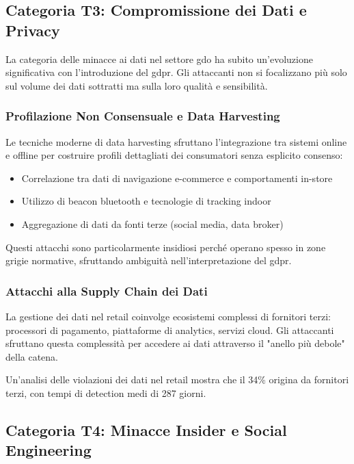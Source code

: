 \subsection{\texorpdfstring{Categoria T3: Compromissione dei Dati e Privacy}{2.2.4 - Categoria T3: Compromissione dei Dati e Privacy}}
\label{subsec:2.2.4_t3}

La categoria delle minacce ai dati nel settore \gls{gdo} ha subito un'evoluzione significativa con l'introduzione del \gls{gdpr}. Gli attaccanti non si focalizzano più solo sul volume dei dati sottratti ma sulla loro qualità e sensibilità.

\subsubsection{Profilazione Non Consensuale e Data Harvesting}

Le tecniche moderne di data harvesting sfruttano l'integrazione tra sistemi online e offline per costruire profili dettagliati dei consumatori senza esplicito consenso:

\begin{itemize}
\item Correlazione tra dati di navigazione e-commerce e comportamenti in-store
\item Utilizzo di beacon bluetooth e tecnologie di tracking indoor
\item Aggregazione di dati da fonti terze (social media, data broker)
\end{itemize}

Questi attacchi sono particolarmente insidiosi perché operano spesso in zone grigie normative, sfruttando ambiguità nell'interpretazione del \gls{gdpr}.

\subsubsection{Attacchi alla Supply Chain dei Dati}

La gestione dei dati nel retail coinvolge ecosistemi complessi di fornitori terzi: processori di pagamento, piattaforme di analytics, servizi cloud. Gli attaccanti sfruttano questa complessità per accedere ai dati attraverso il "anello più debole" della catena.

Un'analisi delle violazioni dei dati nel retail mostra che il 34\% origina da fornitori terzi, con tempi di detection medi di 287 giorni\autocite{Verizon2024}.

\subsection{\texorpdfstring{Categoria T4: Minacce Insider e Social Engineering}{2.2.5 - Categoria T4: Minacce Insider e Social Engineering}}
\label{subsec:2.2.5_t4}


